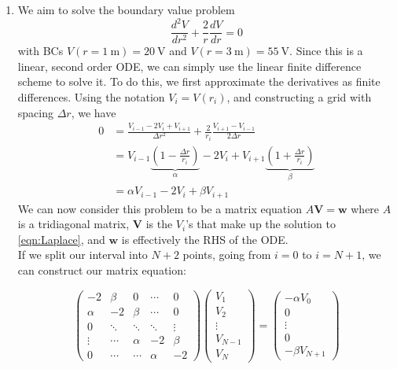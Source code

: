 \documentclass[11pt]{article}
\newcommand{\mb}[1]{\mathbf{#1}}
\begin{document}
\begin{enumerate}
\begin{enumerate}
    \end{enumerate}

    \item We aim to solve the boundary value problem
    \begin{equation}
        \frac{d^2V}{dr^2}+\frac{2}{r}\frac{dV}{dr}=0
        \label{eqn:Laplace}
    \end{equation}
    with BCs $V(r=\SI{1}{\metre})=\SI{20}{\volt}$ and $V(r=\SI{3}{\metre})=\SI{55}{\volt}$. Since this is a linear, second order ODE, we can simply use the linear finite difference scheme to solve it. To do this, we first approximate the derivatives as finite differences. Using the notation $V_i=V(r_i)$, and constructing a grid with spacing $\Delta r$, we have
    \begin{align*}
        0 &= \frac{V_{i-1} - 2V_i + V_{i+1}}{\Delta r^2} + \frac{2}{r_i}\frac{V_{i+1} - V_{i-1}}{2\Delta r} \\
        &= V_{i-1}\underbrace{\left(1-\frac{\Delta r}{r_i}\right)}_\alpha -2V_i+V_{i+1}\underbrace{\left(1+\frac{\Delta r}{r_i}\right)}_\beta \\
        &= \alpha V_{i-1} -2V_i +\beta V_{i+1}
    \end{align*}
    We can now consider this problem to be a matrix equation $A \mb{V}=\mb{w}$ where $A$ is a tridiagonal matrix, $\mb{V}$ is the $V_i$'s that make up the solution to \cref{eqn:Laplace}, and $\mb{w}$ is effectively the RHS of the ODE. \\
    If we split our interval into $N+2$ points, going from $i=0$ to $i=N+1$, we can construct our matrix equation:

    \begin{equation}
        \begin{pmatrix}
            -2 & \beta & 0 & \cdots & 0 \\
            \alpha & -2 & \beta & \cdots & 0 \\
            0 & \ddots & \ddots & \ddots & \vdots \\
            \vdots & \cdots & \alpha & -2 & \beta \\
            0 & \cdots & \cdots & \alpha & -2 
        \end{pmatrix}
        \begin{pmatrix}
            V_1 \\
            V_2 \\
            \vdots \\
            V_{N-1} \\
            V_N
        \end{pmatrix}
        =
        \begin{pmatrix}
            -\alpha V_0 \\
            0 \\
            \vdots \\
            0 \\
            -\beta V_{N+1}
        \end{pmatrix}
        \label{eqn:matrixEqn}
    \end{equation}


\end{enumerate}
\end{document}
